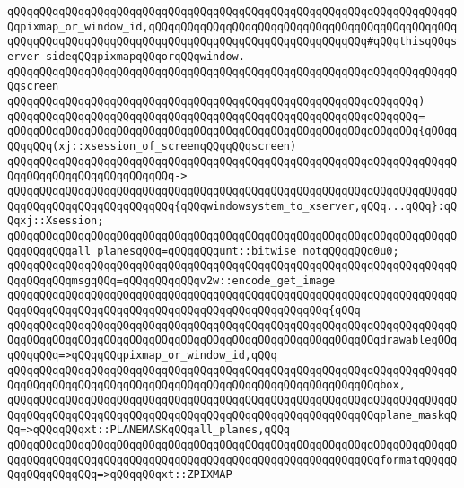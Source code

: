 \verb|qQQqqQQqqQQqqQQqqQQqqQQqqQQqqQQqqQQqqQQqqQQqqQQqqQQqqQQqqQQqqQQqqQQqqQQqpixmap_or_window_id,qQQqqQQqqQQqqQQqqQQqqQQqqQQqqQQqqQQqqQQqqQQqqQQqqQQqqQQqqQQqqQQqqQQqqQQqqQQqqQQqqQQqqQQqqQQqqQQqqQQqqQQq#qQQqthisqQQqserver-sideqQQqpixmapqQQqorqQQqwindow.|\newline
\verb|qQQqqQQqqQQqqQQqqQQqqQQqqQQqqQQqqQQqqQQqqQQqqQQqqQQqqQQqqQQqqQQqqQQqqQQqscreen|\newline
\verb|qQQqqQQqqQQqqQQqqQQqqQQqqQQqqQQqqQQqqQQqqQQqqQQqqQQqqQQqqQQqqQQq)|\newline
\verb|qQQqqQQqqQQqqQQqqQQqqQQqqQQqqQQqqQQqqQQqqQQqqQQqqQQqqQQqqQQqqQQq=|\newline
\verb|qQQqqQQqqQQqqQQqqQQqqQQqqQQqqQQqqQQqqQQqqQQqqQQqqQQqqQQqqQQqqQQq{qQQqqQQqqQQq(xj::xsession_of_screenqQQqqQQqscreen)|\newline
\verb|qQQqqQQqqQQqqQQqqQQqqQQqqQQqqQQqqQQqqQQqqQQqqQQqqQQqqQQqqQQqqQQqqQQqqQQqqQQqqQQqqQQqqQQqqQQqqQQq->|\newline
\verb|qQQqqQQqqQQqqQQqqQQqqQQqqQQqqQQqqQQqqQQqqQQqqQQqqQQqqQQqqQQqqQQqqQQqqQQqqQQqqQQqqQQqqQQqqQQqqQQq{qQQqwindowsystem_to_xserver,qQQq...qQQq}:qQQqxj::Xsession;|\newline
\newline
\newline
\verb|qQQqqQQqqQQqqQQqqQQqqQQqqQQqqQQqqQQqqQQqqQQqqQQqqQQqqQQqqQQqqQQqqQQqqQQqqQQqqQQqall_planesqQQq=qQQqqQQqunt::bitwise_notqQQqqQQq0u0;|\newline
\newline
\verb|qQQqqQQqqQQqqQQqqQQqqQQqqQQqqQQqqQQqqQQqqQQqqQQqqQQqqQQqqQQqqQQqqQQqqQQqqQQqqQQqmsgqQQq=qQQqqQQqqQQqv2w::encode_get_image|\newline
\verb|qQQqqQQqqQQqqQQqqQQqqQQqqQQqqQQqqQQqqQQqqQQqqQQqqQQqqQQqqQQqqQQqqQQqqQQqqQQqqQQqqQQqqQQqqQQqqQQqqQQqqQQqqQQqqQQqqQQqqQQq{qQQq|\newline
\verb|qQQqqQQqqQQqqQQqqQQqqQQqqQQqqQQqqQQqqQQqqQQqqQQqqQQqqQQqqQQqqQQqqQQqqQQqqQQqqQQqqQQqqQQqqQQqqQQqqQQqqQQqqQQqqQQqqQQqqQQqqQQqqQQqdrawableqQQqqQQqqQQq=>qQQqqQQqpixmap_or_window_id,qQQq|\newline
\verb|qQQqqQQqqQQqqQQqqQQqqQQqqQQqqQQqqQQqqQQqqQQqqQQqqQQqqQQqqQQqqQQqqQQqqQQqqQQqqQQqqQQqqQQqqQQqqQQqqQQqqQQqqQQqqQQqqQQqqQQqqQQqqQQqbox,|\newline
\verb|qQQqqQQqqQQqqQQqqQQqqQQqqQQqqQQqqQQqqQQqqQQqqQQqqQQqqQQqqQQqqQQqqQQqqQQqqQQqqQQqqQQqqQQqqQQqqQQqqQQqqQQqqQQqqQQqqQQqqQQqqQQqqQQqplane_maskqQQq=>qQQqqQQqxt::PLANEMASKqQQqall_planes,qQQq|\newline
\verb|qQQqqQQqqQQqqQQqqQQqqQQqqQQqqQQqqQQqqQQqqQQqqQQqqQQqqQQqqQQqqQQqqQQqqQQqqQQqqQQqqQQqqQQqqQQqqQQqqQQqqQQqqQQqqQQqqQQqqQQqqQQqqQQqformatqQQqqQQqqQQqqQQqqQQq=>qQQqqQQqxt::ZPIXMAP|\newline
